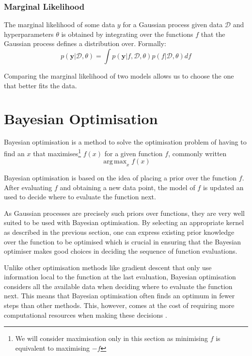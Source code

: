 \documentclass[a4paper,12pt,twoside,openright]{report}
\DeclareMathOperator*{\argmax}{arg\,max}
\begin{document}

\subsubsection{Marginal Likelihood}
The marginal likelihood of some data $y$ for a Gaussian process given data $\mathcal{D}$ and hyperparameters $\theta$ is obtained by integrating over the functions $f$ that the Gaussian process defines a distribution over. Formally:
\begin{equation}
p(\mathbf{y}|\mathcal{D}, \theta) = \int p(\mathbf{y}|f, \mathcal{D}, \theta)p(f|\mathcal{D}, \theta) df
\end{equation}

Comparing the marginal likelihood of two models allows us to choose the one that better fits the data.

\section{Bayesian Optimisation}

Bayesian optimisation is a method to solve the optimisation problem of having to find an $x$ that maximises\footnote{We will consider maximisation only in this section as minimising $f$ is equivalent to maximising $-f$} $f(x)$ for a given function $f$, commonly written 
\begin{equation}
\argmax_x f(x)
\end{equation}

Bayesian optimisation is based on the idea of placing a prior over the function $f$. After evaluating $f$ and obtaining a new data point, the model of $f$ is updated an used to decide where to evaluate the function next.

As Gaussian processes are precisely such priors over functions, they are very well suited to be used with Bayesian optimisation. By selecting an appropriate kernel as described in the previous section, one can express existing prior knowledge over the function to be optimised which is crucial in ensuring that the Bayesian optimiser makes good choices in deciding the sequence of function evaluations.

Unlike other optimisation methods like gradient descent that only use information local to the function at the last evaluation, Bayesian optimisation considers all the available data when deciding where to evaluate the function next. This means that Bayesian optimisation often finds an optimum in fewer steps than other methods. This, however, comes at the cost of requiring more computational resources when making these decisions \cite{PracticalBayesianOptimization}.
\end{document}
